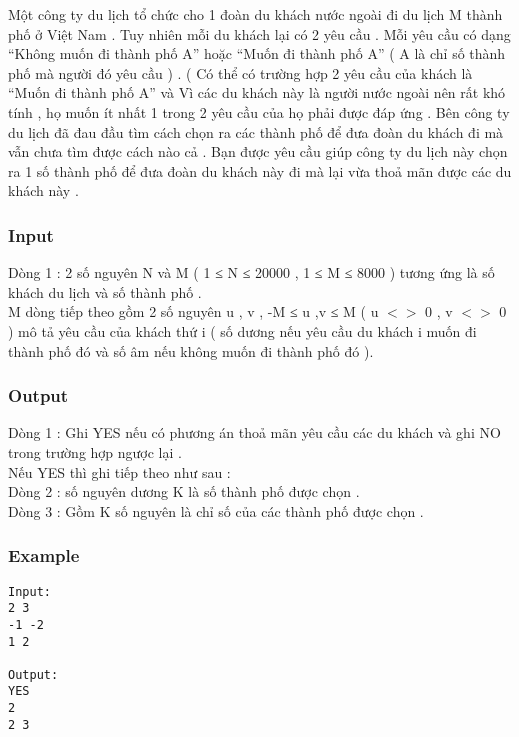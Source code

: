 



   Một công ty du lịch tổ chức cho 1 đoàn du khách nước ngoài đi du lịch M thành phố ở Việt Nam . Tuy nhiên mỗi du khách lại có 2 yêu cầu . Mỗi yêu cầu có dạng “Không muốn đi thành phố A” hoặc “Muốn đi thành phố A” ( A là chỉ số thành phố mà người đó yêu cầu ) . ( Có thể có trường hợp 2 yêu cầu của khách là “Muốn đi thành phố A” và  Vì các du khách này là người nước ngoài nên rất khó tính , họ muốn ít nhất  1 trong 2 yêu cầu của họ phải được đáp ứng . Bên công ty du lịch đã đau đầu tìm cách chọn ra các thành phố để đưa đoàn du khách đi mà vẫn chưa tìm được cách nào cả . Bạn được yêu cầu giúp công ty du lịch này chọn ra 1 số thành phố để đưa đoàn du khách này đi mà lại vừa thoả mãn được các du khách này .  

\subsubsection{   Input  }

   Dòng 1 : 2 số nguyên N và M ( 1 ≤ N ≤ 20000 , 1 ≤ M ≤ 8000 ) tương ứng là số khách du lịch và số thành phố .   
\\   M dòng tiếp theo gồm 2 số nguyên u , v , -M ≤ u ,v ≤ M ( u $<$$>$ 0 , v $<$$>$ 0 ) mô tả yêu cầu của khách thứ i ( số dương nếu yêu cầu du khách i muốn đi thành phố đó và số âm nếu không muốn đi thành phố đó ).   
\\

\subsubsection{   Output  }

   Dòng 1 : Ghi YES nếu có phương án thoả mãn yêu cầu các du khách và ghi NO trong trường hợp ngược lại .   
\\   Nếu YES thì ghi tiếp theo như sau :   
\\   Dòng 2 : số nguyên dương K là số thành phố được chọn .   
\\   Dòng 3 : Gồm K số nguyên là chỉ số của các thành phố được chọn .  

\subsubsection{   Example  }
\begin{verbatim}
Input:
2 3
-1 -2
1 2

Output:
YES
2
2 3
\end{verbatim}